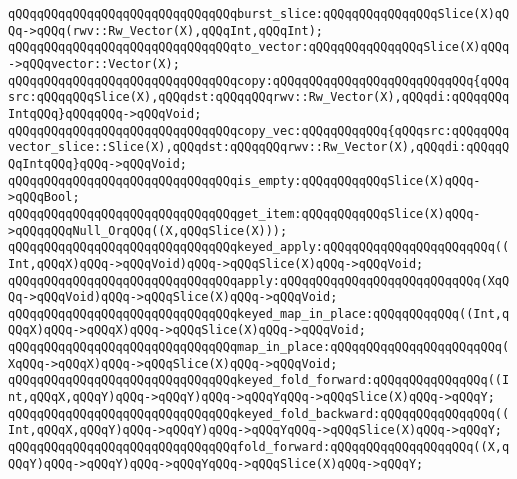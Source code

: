 \newline
\verb|qQQqqQQqqQQqqQQqqQQqqQQqqQQqqQQqburst_slice:qQQqqQQqqQQqqQQqSlice(X)qQQq->qQQq(rwv::Rw_Vector(X),qQQqInt,qQQqInt);|\newline
\verb|qQQqqQQqqQQqqQQqqQQqqQQqqQQqqQQqto_vector:qQQqqQQqqQQqqQQqSlice(X)qQQq->qQQqvector::Vector(X);|\newline
\newline
\verb|qQQqqQQqqQQqqQQqqQQqqQQqqQQqqQQqcopy:qQQqqQQqqQQqqQQqqQQqqQQqqQQq{qQQqsrc:qQQqqQQqSlice(X),qQQqdst:qQQqqQQqrwv::Rw_Vector(X),qQQqdi:qQQqqQQqIntqQQq}qQQqqQQq->qQQqVoid;|\newline
\verb|qQQqqQQqqQQqqQQqqQQqqQQqqQQqqQQqcopy_vec:qQQqqQQqqQQq{qQQqsrc:qQQqqQQqvector_slice::Slice(X),qQQqdst:qQQqqQQqrwv::Rw_Vector(X),qQQqdi:qQQqqQQqIntqQQq}qQQq->qQQqVoid;|\newline
\newline
\verb|qQQqqQQqqQQqqQQqqQQqqQQqqQQqqQQqis_empty:qQQqqQQqqQQqSlice(X)qQQq->qQQqBool;|\newline
\verb|qQQqqQQqqQQqqQQqqQQqqQQqqQQqqQQqget_item:qQQqqQQqqQQqSlice(X)qQQq->qQQqqQQqNull_OrqQQq((X,qQQqSlice(X)));|\newline
\newline
\verb|qQQqqQQqqQQqqQQqqQQqqQQqqQQqqQQqkeyed_apply:qQQqqQQqqQQqqQQqqQQqqQQq((Int,qQQqX)qQQq->qQQqVoid)qQQq->qQQqSlice(X)qQQq->qQQqVoid;|\newline
\verb|qQQqqQQqqQQqqQQqqQQqqQQqqQQqqQQqapply:qQQqqQQqqQQqqQQqqQQqqQQqqQQq(XqQQq->qQQqVoid)qQQq->qQQqSlice(X)qQQq->qQQqVoid;|\newline
\newline
\verb|qQQqqQQqqQQqqQQqqQQqqQQqqQQqqQQqkeyed_map_in_place:qQQqqQQqqQQq((Int,qQQqX)qQQq->qQQqX)qQQq->qQQqSlice(X)qQQq->qQQqVoid;|\newline
\verb|qQQqqQQqqQQqqQQqqQQqqQQqqQQqqQQqmap_in_place:qQQqqQQqqQQqqQQqqQQqqQQq(XqQQq->qQQqX)qQQq->qQQqSlice(X)qQQq->qQQqVoid;|\newline
\newline
\verb|qQQqqQQqqQQqqQQqqQQqqQQqqQQqqQQqkeyed_fold_forward:qQQqqQQqqQQqqQQq((Int,qQQqX,qQQqY)qQQq->qQQqY)qQQq->qQQqYqQQq->qQQqSlice(X)qQQq->qQQqY;|\newline
\verb|qQQqqQQqqQQqqQQqqQQqqQQqqQQqqQQqkeyed_fold_backward:qQQqqQQqqQQqqQQq((Int,qQQqX,qQQqY)qQQq->qQQqY)qQQq->qQQqYqQQq->qQQqSlice(X)qQQq->qQQqY;|\newline
\verb|qQQqqQQqqQQqqQQqqQQqqQQqqQQqqQQqfold_forward:qQQqqQQqqQQqqQQqqQQq((X,qQQqY)qQQq->qQQqY)qQQq->qQQqYqQQq->qQQqSlice(X)qQQq->qQQqY;|\newline
